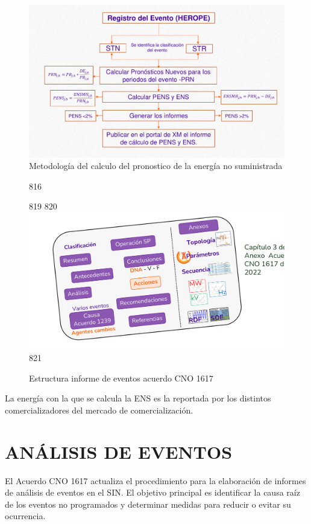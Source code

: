 \documentclass[a5paper]{book}%
\begin{document}
\begin{figure}[H]
  \centering
  \caption{Metodología del calculo del pronostico de la energía no
    suministrada}
  \label{fig:ens}
  \includegraphics[width=\linewidth]{calculo_ens.png}
\end{figure}

\begin{figure}[H]
 816      \caption{Estructura informe de eventos acuerdo CNO 1617}
 819   \label{fig:estructurainforme}
 820   \includegraphics[width=\linewidth]{estructura_informe_eventos1617}
 821 \end{figure}


La energía con la que se calcula la \ac{ENS} es la reportada por los
distintos comercializadores del mercado de comercialización.

  \section{ANÁLISIS DE EVENTOS}

El Acuerdo CNO 1617 actualiza el procedimiento para la elaboración de informes de análisis de eventos en el \ac{SIN}. El objetivo principal es identificar la causa raíz de los eventos no programados y determinar medidas para reducir o evitar su ocurrencia.\\\\
\end{document}
